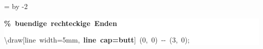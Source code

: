 \begingroup
\ttfamily
{}
=\textwidth
\advance{} by -2\fboxsep
\noindent
\colorbox{background}
{%
\parbox{\dimen255}
{%
\rule[-0.5ex]{0pt}{2.5ex}\hspace*{0.0em}\textcolor{G}{\textbf{\%~buendige~rechteckige~Enden}}\\
\rule[-0.5ex]{0pt}{2.5ex}\hspace*{0.0em}\textbackslash{}draw[line~width=5mm,~\textcolor{R}{\textbf{line~cap=butt}}]~(0,~0)~{-}{-}~(3,~0);}%
}%
\endgroup
